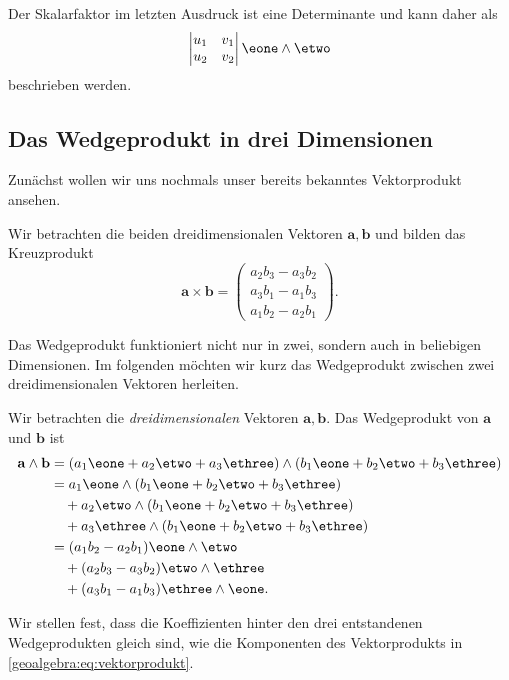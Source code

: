 Der Skalarfaktor im letzten Ausdruck ist eine Determinante und kann daher als
\begin{equation}
  \begin{vmatrix}
    u_1 & v_1 \\
    u_2 & v_2
  \end{vmatrix}
  \eone \wedge \etwo
\end{equation}
beschrieben werden.

\subsection{Das Wedgeprodukt in drei Dimensionen}
Zunächst wollen wir uns nochmals unser bereits bekanntes
Vektorprodukt ansehen.
\begin{definition}
  Wir betrachten die beiden dreidimensionalen Vektoren $\mathbf{a}, \mathbf{b}$
  und bilden das Kreuzprodukt
  \begin{equation}
    \mathbf{a} \times \mathbf{b} = \begin{pmatrix} a_2 b_3 - a_3 b_2 \\ a_3 b_1 - a_1 b_3 \\ a_1 b_2 - a_2 b_1 \end{pmatrix}.
    \label{geoalgebra:eq:vektorprodukt}
  \end{equation}
  
\end{definition}

Das Wedgeprodukt funktioniert nicht nur in zwei, sondern auch
in beliebigen Dimensionen. Im folgenden möchten wir kurz
das Wedgeprodukt zwischen zwei dreidimensionalen Vektoren
herleiten.

\begin{definition}
Wir betrachten die \emph{dreidimensionalen} Vektoren $\mathbf{a}, \mathbf{b}$.
Das Wedgeprodukt von $\mathbf{a}$ und $\mathbf{b}$ ist
\begin{equation}
  \begin{aligned}
      \mathbf{a} \wedge \mathbf{b} &= (a_1 \eone + a_2 \etwo + a_3 \ethree) \wedge (b_1 \eone + b_2 \etwo + b_3 \ethree) \\
      &= a_1 \eone \wedge (b_1 \eone + b_2 \etwo + b_3 \ethree) \\
      &\quad+ a_2 \etwo \wedge (b_1 \eone + b_2 \etwo + b_3 \ethree) \\
      &\quad+ a_3 \ethree \wedge (b_1 \eone + b_2 \etwo + b_3 \ethree) \\
      &= (a_1 b_2 - a_2 b_1) \eone \wedge \etwo \\
      &\quad+ (a_2 b_3 - a_3 b_2) \etwo \wedge \ethree \\
      &\quad+ (a_3 b_1 - a_1 b_3) \ethree \wedge \eone.
  \end{aligned}
\end{equation}
\end{definition}
Wir stellen fest, dass die Koeffizienten hinter den drei entstandenen Wedgeprodukten
gleich sind, wie die Komponenten des Vektorprodukts in \eqref{geoalgebra:eq:vektorprodukt}.

